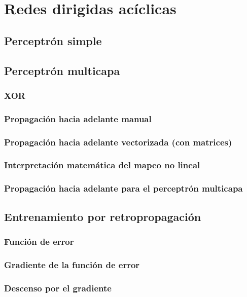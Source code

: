 \documentclass[12pt,openany]{book}
\begin{document}
\part{Redes dirigidas acíclicas}
\chapter{Perceptrón simple}






\chapter{Perceptrón multicapa}
\section{XOR}
\section{Propagación hacia adelante manual}
\section{Propagación hacia adelante vectorizada (con matrices)}
\section{Interpretación matemática del mapeo no lineal}
\section{Propagación hacia adelante para el perceptrón multicapa}


\chapter{Entrenamiento por retropropagación}
\section{Función de error}
\section{Gradiente de la función de error}
\section{Descenso por el gradiente}
\end{document}
